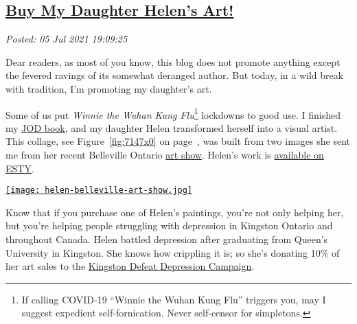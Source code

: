 %

\subsection*{\href{http://analyzethedatanotthedrivel.org/2021/07/05/buy-my-daughter-helens-art/}{Buy My Daughter Helen's Art!}}


\noindent\emph{Posted: 05 Jul 2021 19:09:25}
\vspace{6pt}

\captionsetup[figure]{labelformat=default}

Dear readers, as most of you know, this blog does not promote anything
except the fevered ravings of its somewhat deranged author. But today,
in a wild break with tradition, I'm promoting my daughter's art.

Some of us put \emph{Winnie the Wuhan Kung
Flu}\footnote{If calling COVID-19 ``Winnie the Wuhan Kung Flu'' triggers you, may I
suggest expedient self-fornication. Never self-censor for simpletons.} lockdowns to good use.
I finished my \href{https://www.amazon.com/dp/B08M2KBMND}{JOD book}, and
my daughter Helen transformed herself into a visual artist. This collage, see Figure~\ref{fig:7147x0} on page~\pageref{fig:7147x0}, 
was built from two images she sent me from her recent Belleville Ontario
\href{https://bazaarmarket.ca/}{art show}. Helen's work is
\href{https://www.etsy.com/shop/HBBArtByHelen?ref=profile_header}{available
on ESTY}.


\begin{SCfigure}[2]
\centering
\href{https://bakerjd99.files.wordpress.com/2021/07/helen-belleville-art-show.jpg}{\texttt{[image: helen-belleville-art-show.jpg]}}
\caption{A collage of my daughter's art show kiosk and one of her paintings.
More of Helen's work is \href{https://www.etsy.com/shop/HBBArtByHelen?ref=profile_header}{available
on ESTY}.}
\label{fig:7147x0}
\end{SCfigure}


Know that if you purchase one of Helen's paintings, you're not only
helping her, but you're helping people struggling with depression in
Kingston Ontario and throughout Canada. Helen battled depression after
graduating from Queen's University in Kingston. She knows how crippling
it is; so she's donating 10\% of her art sales to the
\href{https://www.defeatdepression.ca/}{Kingston Defeat Depression
Campaign}.


